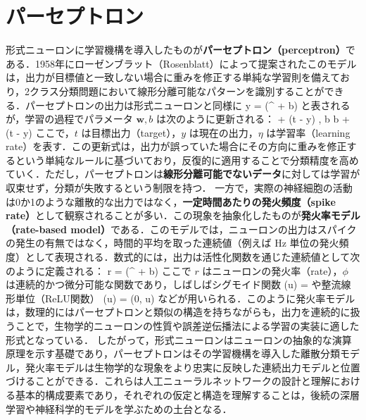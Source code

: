 \section{パーセプトロン}
形式ニューロンに学習機構を導入したものが\textbf{パーセプトロン（perceptron）}である．1958年にローゼンブラット（Rosenblatt）によって提案されたこのモデルは，出力が目標値と一致しない場合に重みを修正する単純な学習則を備えており，2クラス分類問題において線形分離可能なパターンを識別することができる．パーセプトロンの出力は形式ニューロンと同様に
y = \phi(^\top {} + b)
と表されるが，学習の過程でパラメータ $\mathbf{w}, b$ は次のように更新される：
 \leftarrow {} + \eta (t - y) , \quad b \leftarrow b + \eta (t - y)
ここで，$t$ は目標出力（target），$y$ は現在の出力，$\eta$ は学習率（learning rate）を表す．この更新式は，出力が誤っていた場合にその方向に重みを修正するという単純なルールに基づいており，反復的に適用することで分類精度を高めていく．ただし，パーセプトロンは\textbf{線形分離可能でないデータ}に対しては学習が収束せず，分類が失敗するという制限を持つ．
一方で，実際の神経細胞の活動は0か1のような離散的な出力ではなく，\textbf{一定時間あたりの発火頻度（spike rate）}として観察されることが多い．この現象を抽象化したものが\textbf{発火率モデル（rate-based model）}である．このモデルでは，ニューロンの出力はスパイクの発生の有無ではなく，時間的平均を取った連続値（例えば Hz 単位の発火頻度）として表現される．数式的には，出力は活性化関数を通じた連続値として次のように定義される：
r = \phi(^\top {} + b)
ここで $r$ はニューロンの発火率（rate），$\phi$ は連続的かつ微分可能な関数であり，しばしばシグモイド関数
\phi(u) = 
や整流線形単位（ReLU関数）
\phi(u) = \max(0, u)
などが用いられる．このように発火率モデルは，数理的にはパーセプトロンと類似の構造を持ちながらも，出力を連続的に扱うことで，生物学的ニューロンの性質や誤差逆伝播法による学習の実装に適した形式となっている．
したがって，形式ニューロンはニューロンの抽象的な演算原理を示す基礎であり，パーセプトロンはその学習機構を導入した離散分類モデル，発火率モデルは生物学的な現象をより忠実に反映した連続出力モデルと位置づけることができる．これらは人工ニューラルネットワークの設計と理解における基本的構成要素であり，それぞれの仮定と構造を理解することは，後続の深層学習や神経科学的モデルを学ぶための土台となる．
